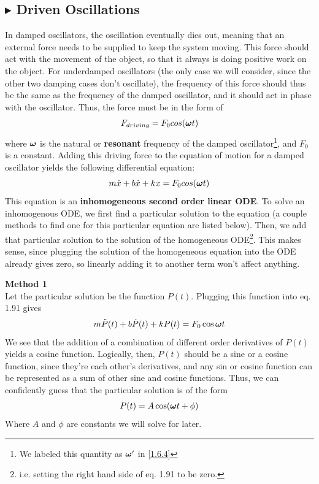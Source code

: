 \subsection{\color{Orchid} $\blacktriangleright$ \color{black} Driven Oscillations}\label{1.6.6}
In damped oscillators, the oscillation eventually dies out, meaning that an external force needs to be supplied to keep the system moving. This force should act with the movement of the object, so that it always is doing positive work on the object. For underdamped oscillators (the only case we will consider, since the other two damping cases don't oscillate), the frequency of this force should thus be the same as the frequency of the damped oscillator, and it should act in phase with the oscillator. Thus, the force must be in the form of 
\begin{equation}
    F_{driving} = F_0 cos(\boldsymbol{\omega} t)
\end{equation}
\noindent where $\boldsymbol{\omega}$ is the natural or \textbf{resonant} frequency of the damped oscillator\footnote{We labeled this quantity as $\boldsymbol{\omega}'$ in \ref{1.6.4}}, and $F_0$ is a constant. Adding this driving force to the equation of motion for a damped oscillator yields the following differential equation:
\begin{equation}
    m\ddot{x} + b\dot{x} + kx = F_0 cos(\boldsymbol{\omega} t)
\end{equation}
\noindent This equation is an \textbf{inhomogeneous second order linear ODE}. To solve an inhomogenous ODE, we first find a particular solution to the equation (a couple methods to find one for this particular equation are listed below). Then, we add that particular solution to the solution of the homogeneous ODE\footnote{i.e. setting the right hand side of eq. 1.91 to be zero.}. This makes sense, since plugging the solution of the homogeneous equation into the ODE already gives zero, so linearly adding it to another term won't affect anything.

\noindent \textbf{Method 1} \\
\noindent Let the particular solution be the function $P(t)$. Plugging this function into eq. 1.91 gives
\begin{equation}
    m\ddot{P}(t) + b\dot{P}(t) + kP(t) = F_0\cos{\boldsymbol{\omega}t} 
\end{equation}
\noindent We see that the addition of a combination of different order derivatives of $P(t)$ yields a cosine function. Logically, then, $P(t)$ should be a sine or a cosine function, since they're each other's derivatives, and any sin or cosine function can be represented as a sum of other sine and cosine functions. Thus, we can confidently guess that the particular solution is of the form
\begin{equation*}
    P(t) = A\cos(\boldsymbol{\omega} t + \phi)
\end{equation*}
\noindent Where $A$ and $\phi$ are constants we will solve for later.

